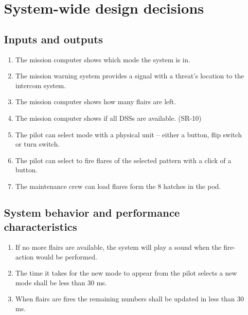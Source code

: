 \documentclass[Main]{subfiles}
\begin{document}
\setcounter{chapter}{2}
\chapter{System-wide design decisions}


\section{Inputs and outputs}

\begin{enumerate}[label=\bfseries DDD-\arabic*:]

\item The mission computer shows which mode the system is in.

\item The mission warning system provides a signal with a threat's location to the intercom system.

\item The mission computer shows how many flairs are left.

\item The mission computer shows if all DSSs are available. (SR-10)

\item The pilot can select mode with a physical unit -- either a button, flip switch or turn switch.

\item The pilot can select to fire flares of the selected pattern with a click of a button.

\item The maintenance crew can load flares form the 8 hatches in the pod.

\end{enumerate}

\section{System behavior and performance characteristics}

\begin{enumerate}[resume*]

\item If no more flairs are available, the system will play a sound when the fire-action would be performed.

\item The time it takes for the new mode to appear from the pilot selects a new mode shall be less than 30 ms.

\item When flairs are fires the remaining numbers shall be updated in less than 30 ms.
\end{enumerate}
\end{document}
